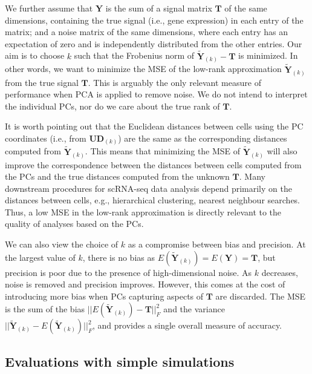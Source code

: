 \documentclass[10pt,letterpaper]{article}
\begin{document}
We further assume that $\mathbf{Y}$ is the sum of a signal matrix $\mathbf{T}$ of the same dimensions, 
containing the true signal (i.e., gene expression) in each entry of the matrix;
and a noise matrix of the same dimensions, where each entry has an expectation of zero and is independently distributed from the other entries.
Our aim is to choose $k$ such that the Frobenius norm of $\mathbf{\tilde Y}_{(k)} - \mathbf{T}$ is minimized.
In other words, we want to minimize the MSE of the low-rank approximation $\mathbf{\tilde Y}_{(k)}$ from the true signal $\mathbf{T}$.
This is arguably the only relevant measure of performance when PCA is applied to remove noise.
We do not intend to interpret the individual PCs, nor do we care about the true rank of $\mathbf{T}$.

It is worth pointing out that the Euclidean distances between cells using the PC coordinates (i.e., from $\mathbf{U}\mathbf{D}_{(k)}$) are the same as the corresponding distances computed from $\mathbf{\tilde Y}_{(k)}$.
This means that minimizing the MSE of $\mathbf{\tilde Y}_{(k)}$ will also improve the correspondence between the distances between cells computed from the PCs and the true distances computed from the unknown $\mathbf{T}$.
Many downstream procedures for scRNA-seq data analysis depend primarily on the distances between cells, e.g., hierarchical clustering, nearest neighbour searches.
Thus, a low MSE in the low-rank approximation is directly relevant to the quality of analyses based on the PCs.

We can also view the choice of $k$ as a compromise between bias and precision.
At the largest value of $k$, there is no bias as $E(\mathbf{\tilde Y}_{(k)}) = E(\mathbf{Y}) = \mathbf{T}$, but precision is poor due to the presence of high-dimensional noise.
As $k$ decreases, noise is removed and precision improves.
However, this comes at the cost of introducing more bias when PCs capturing aspects of $\mathbf{T}$ are discarded.
The MSE is the sum of the bias $||E(\mathbf{\tilde Y}_{(k)}) - \mathbf{T}||^2_F$ and the variance $||\mathbf{\tilde Y}_{(k)} - E(\mathbf{\tilde Y}_{(k)})||^2_F$, and provides a single overall measure of accuracy.

\subsection{Evaluations with simple simulations}
\end{document}
